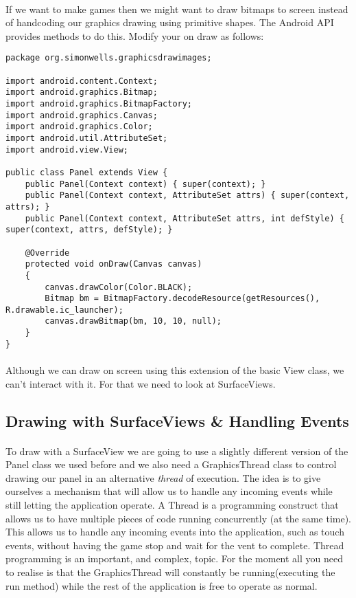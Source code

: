 \paragraph{} If we want to make games then we might want to draw bitmaps to screen instead of handcoding our graphics drawing using primitive shapes. The Android API provides methods to do this. Modify your on draw as follows:

\begin{lstlisting}
package org.simonwells.graphicsdrawimages;

import android.content.Context;
import android.graphics.Bitmap;
import android.graphics.BitmapFactory;
import android.graphics.Canvas;
import android.graphics.Color;
import android.util.AttributeSet;
import android.view.View;

public class Panel extends View {
    public Panel(Context context) { super(context); }
    public Panel(Context context, AttributeSet attrs) { super(context, attrs); }
    public Panel(Context context, AttributeSet attrs, int defStyle) { super(context, attrs, defStyle); }

    @Override
    protected void onDraw(Canvas canvas)
    {
        canvas.drawColor(Color.BLACK);
        Bitmap bm = BitmapFactory.decodeResource(getResources(), R.drawable.ic_launcher);
        canvas.drawBitmap(bm, 10, 10, null);
    }
}
\end{lstlisting}

\paragraph{} Although we can draw on screen using this extension of the basic View class, we can't interact with it. For that we need to look at SurfaceViews.

\subsection{Drawing with SurfaceViews \& Handling Events}
\paragraph{} To draw with a SurfaceView we are going to use a slightly different version of the Panel class we used before and we also need a GraphicsThread class to control drawing our panel in an alternative {\emph{thread}} of execution. The idea is to give ourselves a mechanism that will allow us to handle any incoming events while still letting the application operate. A Thread is a programming construct that allows us to have multiple pieces of code running concurrently (at the same time). This allows us to handle any incoming events into the application, such as touch events, without having the game stop and wait for the vent to complete. Thread programming is an important, and complex, topic. For the moment all you need to realise is that the GraphicsThread will constantly be running(executing the run method) while the rest of the application is free to operate as normal.

